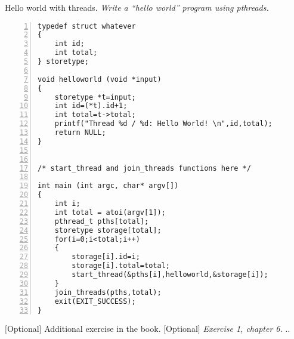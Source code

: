 \documentclass{article}
\begin{document}
\begin{ExerciseList}
\Exercise Hello world with threads.
\newpage
\Question \emph{Write a ``hello world'' program using pthreads.} 

\begin{lstlisting}[basicstyle=\small\sffamily,
keywords={break,case,const,continue,default,else,enum,
for,if,return,switch,while,do,long,void,int,float,double,
char,struct,typedef,include,size\_t},
keywordstyle={\color{blue}},
comment={[l]{//}}, morecomment={[s]{/*}{*/}}, commentstyle=\itshape,
columns={[l]flexible}, numbers=left, numberstyle=\tiny,
frameround=fftt, frame=shadowbox, captionpos=b,
caption={Hello world with pthreads.},
label=LST:hello]
typedef struct whatever
{
	int id;
	int total;
} storetype;

void helloworld (void *input)
{
	storetype *t=input;
	int id=(*t).id+1;
	int total=t->total;
	printf("Thread %d / %d: Hello World! \n",id,total);
	return NULL;
}


/* start_thread and join_threads functions here */

int main (int argc, char* argv[])
{
	int i;
	int total = atoi(argv[1]);
	pthread_t pths[total];
	storetype storage[total];
	for(i=0;i<total;i++)
	{
		storage[i].id=i;
		storage[i].total=total;
		start_thread(&pths[i],helloworld,&storage[i]);
	}
	join_threads(pths,total);
	exit(EXIT_SUCCESS);
}
\end{lstlisting}


\Exercise $[$Optional$]$ Additional exercise in the book.
\Question $[$Optional$]$ \emph{Exercise 1, chapter 6.}
\Answer .. %

\end{ExerciseList}
\end{document}
